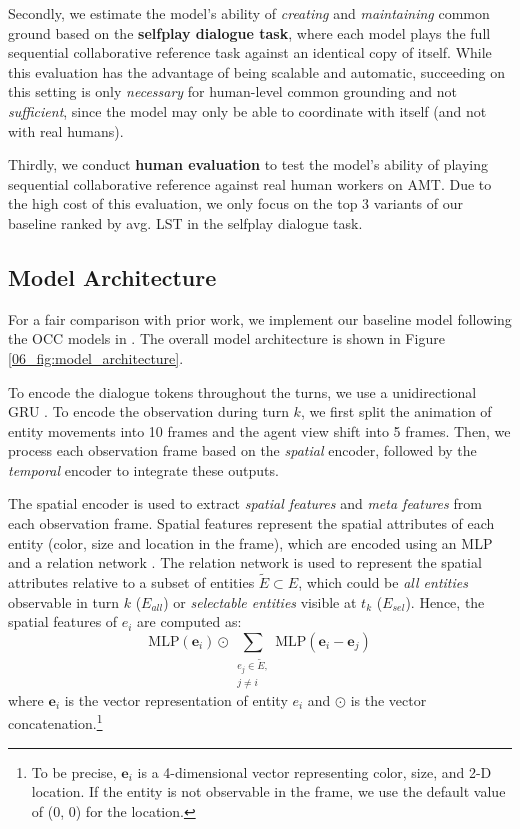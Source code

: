 Secondly, we estimate the model's ability of \textit{creating} and \textit{maintaining} common ground based on the \textbf{selfplay dialogue task}, where each model plays the full sequential collaborative reference task against an identical copy of itself. While this evaluation has the advantage of being scalable and automatic, succeeding on this setting is only \textit{necessary} for human-level common grounding and not \textit{sufficient}, since the model may only be able to coordinate with itself (and not with real humans).

Thirdly, we conduct \textbf{human evaluation} to test the model's ability of playing sequential collaborative reference against real human workers on AMT. Due to the high cost of this evaluation, we only focus on the top 3 variants of our baseline ranked by avg. LST in the selfplay dialogue task.

\subsection{Model Architecture}
\label{06_subsec:model}

For a fair comparison with prior work, we implement our baseline model following the OCC models in \citet{udagawa2020annotated}. The overall model architecture is shown in Figure \ref{06_fig:model_architecture}.

To encode the dialogue tokens throughout the turns, we use a unidirectional GRU \citep{cho2014properties}. To encode the observation during turn $k$, we first split the animation of entity movements into 10 frames and the agent view shift into 5 frames. Then, we process each observation frame based on the \textit{spatial} encoder, followed by the \textit{temporal} encoder to integrate these outputs.

The spatial encoder is used to extract \textit{spatial features} and \textit{meta features} from each observation frame. Spatial features represent the spatial attributes of each entity (color, size and location in the frame), which are encoded using an MLP and a relation network \citep{santoro2017simple}. The relation network is used to represent the spatial attributes relative to a subset of entities $\tilde{E} \subset E$, which could be \textit{all entities} observable in turn $k$ ($E_{all}$) or \textit{selectable entities} visible at $t_k$ ($E_{sel}$). Hence, the spatial features of $e_i$ are computed as:
%
\begin{equation}\label{eqt:spatial_features}
\mathrm{MLP}(\mathbf{e}_i) \odot \sum_{\substack{e_j \in \tilde E, \\ j \neq i }} \mathrm{MLP}(\mathbf{e}_i - \mathbf{e}_j)
\end{equation}
%
where  $\mathbf{e}_i$ is the vector representation of entity $e_i$ and $\odot$ is the vector concatenation.\footnote{To be precise, $\mathbf{e}_i$ is a 4-dimensional vector representing color, size, and 2-D location. If the entity is not observable in the frame, we use the default value of (0, 0) for the location.}

